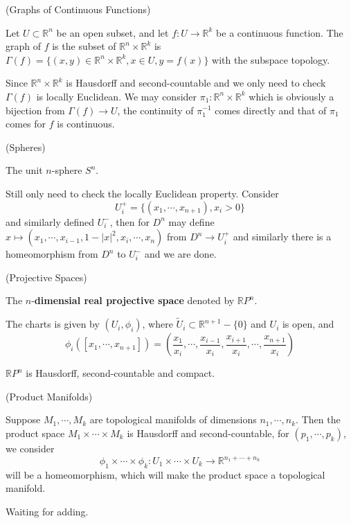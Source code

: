 \begin{definition}
\begin{example}(Graphs of Continuous Functions)\par
    Let $U\subset\mathbb{R}^n$ be an open subset, and let $f:U\to \mathbb{R}^k$ be a continuous function. The graph of $f$  is the subset of $\mathbb{R}^n\times\mathbb{R}^k$ is $\Gamma(f) = \{(x,y) \in \mathbb{R}^n\times\mathbb{R}^k, x\in U, y = f(x)\}$ with the subspace topology.
\end{example}
\Pf\par
    Since $\mathbb{R}^n\times \mathbb{R}^k$ is Hausdorff and second-countable and we only need to check $\Gamma(f)$ is locally Euclidean. We may consider $\pi_1:\mathbb{R}^n \times \mathbb{R}^k$ which is obviously a bijection from $\Gamma(f) \to U$, the continuity of $\pi_1^{-1}$ comes directly and that of $\pi_1$ comes for $f$ is continuous.

\begin{example}(Spheres)\par
    The unit $n$-sphere $S^n$.
\end{example}
\Pf\par
    Still only need to check the locally Euclidean property. Consider \[U_i^+ = \{(x_1,\cdots,x_{n+1}), x_i >0\}\] and similarly defined $U_i^-$, then for $D^n$ may define $x\mapsto (x_1,\cdots, x_{i-1}, 1-|x|^2,x_i,\cdots,x_n)$ from $D^n \to U_i^+$ and similarly there is a homeomorphism from $D^n$ to $U_i^-$ and we are done.

\begin{example}(Projective Spaces)\par
    The $n$-\textbf{dimensial real projective space} denoted by $\mathbb{R}P^n$.
\end{example}
    The charts is given by $(U_i, \phi_i)$, where $\widetilde{U}_i \subset \mathbb{R}^{{n+1}}-\{0\}$ and $U_i$ is open, and 
    \[\phi_i([x_1,\cdots,x_{n+1}]) = \left(\dfrac{x_1}{x_i},\cdots, \dfrac{x_{i-1}}{x_i},\dfrac{x_{i+1}}{x_i},\cdots, \dfrac{x_{n+1}}{x_i}\right)\]
\end{definition}

\begin{proposition}
    $\mathbb{R}P^n$ is Hausdorff, second-countable and compact.
\end{proposition}

\begin{definition}(Product Manifolds)\par
    Suppose $M_1,\cdots,M_k$ are topological manifolds of dimensions $n_1,\cdots,n_k$. Then the product space $M_1\times \cdots \times M_k$ is Hausdorff and second-countable, for $(p_1,\cdots,p_k)$, we consider
    \[\phi_1\times\cdots \times\phi_k : U_1\times \cdots \times U_k \to \mathbb{R}^{n_1+\cdots + n_k}\]
    will be a homeomorphism, which will make the product space a topological manifold.
\end{definition}
\Pf\par
    Waiting for adding.

